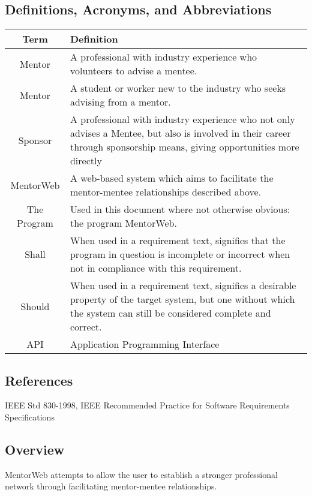 \documentclass[11pt]{article}
\begin{document}
	\subsection{Definitions, Acronyms, and Abbreviations}
		\begin{tabular}{cp{10 cm}}
			Term                 & Definition \\ \hline
			Mentor\index{Mentor} & A professional with industry experience who
			                       volunteers to advise a mentee. \\ \hline
			Mentor\index{Mentee} & A student or worker new to the industry who
								   seeks advising from a mentor. \\ \hline
			Sponsor\index{Sponsor}
			                     & A professional with industry experience who
			                       not only advises a Mentee, but also is
								   involved in their career through sponsorship
								   means, giving opportunities more directly
								   \\ \hline
			MentorWeb\index{MentorWeb}
			                     & A web-based system which aims to facilitate
			                       the mentor\index{Mentor}-mentee\index{Mentee}
								   relationships described above. \\ \hline
			The Program          & Used in this document where not otherwise
								   obvious: the program MentorWeb. \\ \hline
			Shall                & When used in a requirement text, signifies
								   that the program in question is incomplete or
								   incorrect when not in compliance with this
								   requirement. \\ \hline
			Should               & When used in a requirement text, signifies
								   a desirable property of the target system,
								   but one without which the system can still be
								   considered complete and correct. \\ \hline
			API                  & Application Programming Interface \\ \hline
		\end{tabular}

	\subsection{References}
		IEEE Std 830-1998, IEEE Recommended Practice for Software Requirements
		Specifications

	\subsection{Overview}
		MentorWeb attempts to allow the user to establish a
		stronger professional network through facilitating
		mentor-mentee relationships.
\end{document}
